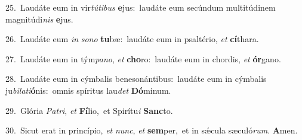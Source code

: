 {\numbfont\textcolor{\numbcolor}{25.}}~Laudáte eum in vir\-\textit{tú}\-\textit{ti}\textit{bus} \textbf{e}\-jus:~\star laudáte eum secúndum multitúdinem magnitúdi\textit{nis} \textbf{e}\-jus.\par
{\numbfont\textcolor{\numbcolor}{26.}}~Laudáte eum \textit{in} \textit{so}\-\textit{no} \textbf{tu}\-bæ:~\star laudáte eum in psaltério, \textit{et} \textbf{cí}\-thara.\par
{\numbfont\textcolor{\numbcolor}{27.}}~Laudáte eum in tým\-\textit{pa}\-\textit{no}, \textit{et} \textbf{cho}\-ro:~\star laudáte eum in chordis, \textit{et} \textbf{ór}\-gano.\par
{\numbfont\textcolor{\numbcolor}{28.}}~Laudáte eum in cýmbalis benesonántibus:~\dagger laudáte eum in cýmbalis ju\-\textit{bi}\-\textit{la}\textit{ti}\textbf{ó}nis:~\star omnis spíritus lau\textit{det} \textbf{Dó}\-minum.\par
{\numbfont\textcolor{\numbcolor}{29.}}~Glória \textit{Pa}\-\textit{tri}, \textit{et} \textbf{Fí}\-lio,~\star et Spirítu\textit{i} \textbf{Sanc}\-to.\par
{\numbfont\textcolor{\numbcolor}{30.}}~Sicut erat in princípio, \textit{et} \textit{nunc}\-, \textit{et} \textbf{sem}\-per,~\star et in sǽcula sæculó\-\textit{rum}\-. \textbf{A}\-men.\par
